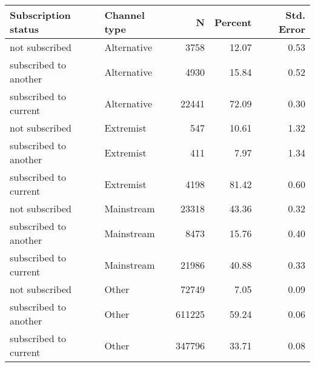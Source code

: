 \begin{table}[H]
\centering
\begin{tabular}[t]{llrrr}
\toprule
Subscription status & Channel type & N & Percent & Std. Error\\
\midrule
not subscribed & Alternative & 3758 & 12.07 & 0.53\\
subscribed to another & Alternative & 4930 & 15.84 & 0.52\\
subscribed to current & Alternative & 22441 & 72.09 & 0.30\\
not subscribed & Extremist & 547 & 10.61 & 1.32\\
subscribed to another & Extremist & 411 & 7.97 & 1.34\\
\addlinespace
subscribed to current & Extremist & 4198 & 81.42 & 0.60\\
not subscribed & Mainstream & 23318 & 43.36 & 0.32\\
subscribed to another & Mainstream & 8473 & 15.76 & 0.40\\
subscribed to current & Mainstream & 21986 & 40.88 & 0.33\\
not subscribed & Other & 72749 & 7.05 & 0.09\\
\addlinespace
subscribed to another & Other & 611225 & 59.24 & 0.06\\
subscribed to current & Other & 347796 & 33.71 & 0.08\\
\bottomrule
\end{tabular}
\end{table}
